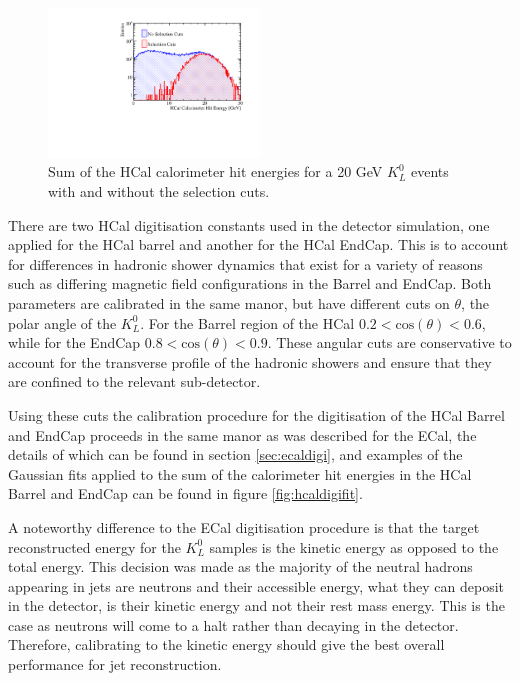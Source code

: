 \begin{figure}
\includegraphics[width=0.5\textwidth]{EnergyEstimators/Plots/Calibration/Digitsation/HCal/DigitisationHCalSelection.pdf}
\caption[Sum of the HCal calorimeter hit energies for a 20 GeV $K^{0}_{L}$ events with and without the selection cuts.]{Sum of the HCal calorimeter hit energies for a 20 GeV $K^{0}_{L}$ events with and without the selection cuts.}
\label{fig:hcaldigiselection}
\end{figure}

There are two HCal digitisation constants used in the detector simulation, one applied for the HCal barrel and another for the HCal EndCap.  This is to account for differences in hadronic shower dynamics that exist for a variety of reasons such as differing magnetic field configurations in the Barrel and EndCap.  Both parameters are calibrated in the same manor, but have different cuts on $\theta$, the polar angle of the $K^{0}_{L}$.  For the Barrel region of the HCal $0.2 < \text{cos}(\theta) < 0.6$, while for the EndCap $0.8 < \text{cos}(\theta) < 0.9$.  These angular cuts are conservative to account for the transverse profile of the hadronic showers and ensure that they are confined to the relevant sub-detector.

Using these cuts the calibration procedure for the digitisation of the HCal Barrel and EndCap proceeds in the same manor as was described for the ECal, the details of which can be found in section \ref{sec:ecaldigi}, and examples of the Gaussian fits applied to the sum of the calorimeter hit energies in the HCal Barrel and EndCap can be found in figure \ref{fig:hcaldigifit}.  

A noteworthy difference to the ECal digitisation procedure is that the target reconstructed energy for the $K^{0}_{L}$ samples is the kinetic energy as opposed to the total energy.  This decision was made as the majority of the neutral hadrons appearing in jets are neutrons and their accessible energy, what they can deposit in the detector, is their kinetic energy and not their rest mass energy.  This is the case as neutrons will come to a halt rather than decaying in the detector.  Therefore, calibrating to the kinetic energy should give the best overall performance for jet reconstruction.  

